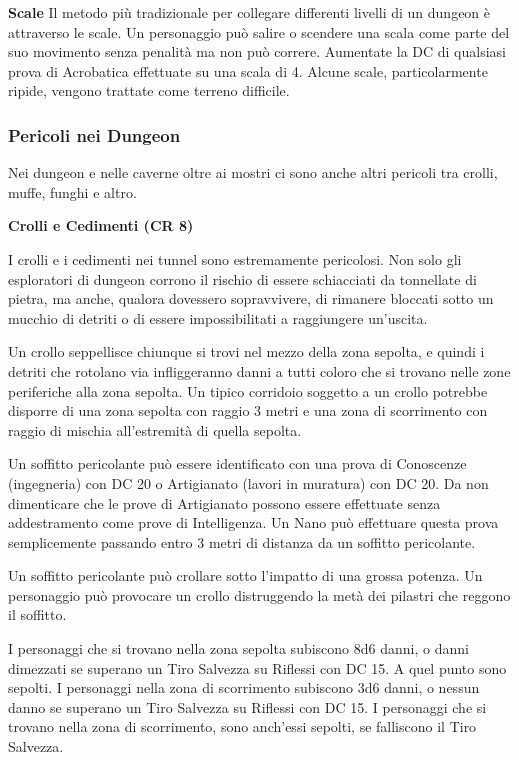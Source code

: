 \documentclass[a4paper,11pt,twoside,openany]{book}
\begin{document}
\textbf{Scale} Il metodo più tradizionale per collegare differenti livelli di un dungeon è attraverso le scale. Un personaggio può salire o scendere una scala come parte del suo movimento senza penalità ma non può correre. Aumentate la DC di qualsiasi prova di Acrobatica effettuate su una scala di 4. Alcune scale, particolarmente ripide, vengono trattate come terreno difficile.

\subsubsection{Pericoli nei Dungeon}

Nei dungeon e nelle caverne oltre ai mostri ci sono anche altri pericoli tra crolli, muffe, funghi e altro.

\textbf{Crolli e Cedimenti (CR 8)}

I crolli e i cedimenti nei tunnel sono estremamente pericolosi. Non solo gli esploratori di dungeon corrono il rischio di essere schiacciati da tonnellate di pietra, ma anche, qualora dovessero sopravvivere, di rimanere bloccati sotto un mucchio di detriti o di essere impossibilitati a raggiungere un'uscita.

Un crollo seppellisce chiunque si trovi nel mezzo della zona sepolta, e quindi i detriti che rotolano via infliggeranno danni a tutti coloro che si trovano nelle zone periferiche alla zona sepolta. Un tipico corridoio soggetto a un crollo potrebbe disporre di una zona sepolta con raggio 3 metri e una zona di scorrimento con raggio di mischia all'estremità di quella sepolta.

Un soffitto pericolante può essere identificato con una prova di Conoscenze (ingegneria) con DC 20 o Artigianato (lavori in muratura) con DC 20. Da non dimenticare che le prove di Artigianato possono essere effettuate senza addestramento come prove di Intelligenza. Un Nano può effettuare questa prova semplicemente passando entro 3 metri di distanza da un soffitto pericolante.

Un soffitto pericolante può crollare sotto l'impatto di una grossa potenza. Un personaggio può provocare un crollo distruggendo la metà dei pilastri che reggono il soffitto.

I personaggi che si trovano nella zona sepolta subiscono 8d6 danni, o danni dimezzati se superano un Tiro Salvezza su Riflessi con DC 15. A quel punto sono sepolti. I personaggi nella zona di scorrimento subiscono 3d6 danni, o nessun danno se superano un Tiro Salvezza su Riflessi con DC 15. I personaggi che si trovano nella zona di scorrimento, sono anch'essi sepolti, se falliscono il Tiro Salvezza.
\end{document}
